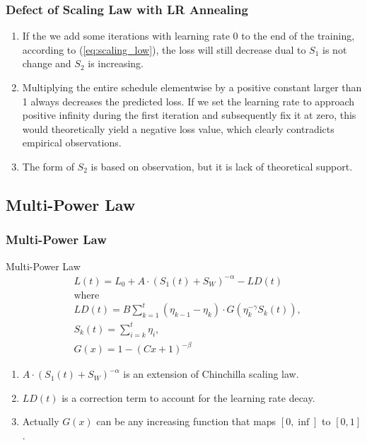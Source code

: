 \documentclass[aspectratio=169]{beamer}
\begin{document}
    \begin{frame}
        \frametitle{Defect of Scaling Law with LR Annealing}
        \begin{enumerate}
            \item If the we add some iterations with learning rate 0 to
            the end of the training, according to
            (\ref{eq:scaling_low}), the loss will still decrease dual
            to $S_1$ is not change and $S_2$ is increasing.
            \item Multiplying the entire schedule elementwise by a
            positive constant larger than 1 always decreases the predicted loss.
            If we set the learning rate to approach positive infinity
            during the first iteration and subsequently fix it at
            zero, this would theoretically yield a negative loss
            value, which clearly contradicts empirical observations.
            \item The form of $S_2$ is based on observation, but it is lack of
            theoretical support.
        \end{enumerate}
    \end{frame}

    \subsection{Multi-Power Law}\label{subsec:MPL}

    \begin{frame}
        \frametitle{Multi-Power Law}
        \begin{block}{Multi-Power Law}
            \begin{equation}
                \label{eq:multi_power_law}
                \begin{aligned}
                    &L(t) = L_0 + A\cdot (S_1(t) + S_W)^{-\alpha} - LD(t)\\
                    &\text{where} \\
                    & LD(t) = B\sum_{k=1}^{t}(\eta_{k-1}-\eta_k)\cdot
                    G(\eta_k^{-\gamma}S_k(t)), \\
                    &S_k(t) = \sum_{i=k}^{t} \eta_i, \\
                    &G(x) = 1-(Cx+1)^{-\beta}
                \end{aligned}
            \end{equation}
        \end{block}

        \begin{enumerate}
            \item $A\cdot (S_1(t) + S_W)^{-\alpha}$ is an extension of
            Chinchilla scaling law.
            \item $LD(t)$ is a correction term to account for the
            learning rate decay.
            \item Actually $G(x)$ can be any increasing function that
            maps $[0, \inf]$ to $[0, 1]$.
        \end{enumerate}
    \end{frame}
\end{document}
